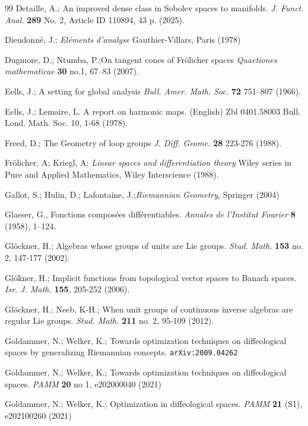 \documentclass{amsart}
\newcounter{ex}
\newcounter{re}
\begin{document}
\begin{thebibliography}{99}
 Detaille, A.;
An improved dense class in Sobolev spaces to manifolds. 
\emph{J. Funct. Anal.} {\bf 289} No. 2, Article ID 110894, 43 p. (2025). 

 Dieudonn\'e, J.; \textit{El\'ements d'analyse} Gauthier-Villars, Paris (1978)
	
 Dugmore, D.; Ntumba, P.;On tangent cones of Fr\"olicher spaces
\textit{Quaetiones mathematicae} \textbf{30} no.1,
67--83 (2007).


 Eells, J.;  A setting for global analysis
\textit{Bull. Amer. Math. Soc.} {\bf 72} 751--807 (1966).

 Eells, J.; Lemaire, L.
A report on harmonic maps. (English) Zbl 0401.58003
Bull. Lond. Math. Soc. 10, 1-68 (1978). 

 Freed, D.; The Geometry of loop groups \textit{J. Diff. Geome.} \textbf{28} 223-276 (1988).

 Fr\"olicher, A; Kriegl, A; {\it Linear spaces and differentiation theory} Wiley series in Pure and Applied Mathematics, Wiley Interscience  (1988).

 Gallot, S.; Hulin, D.; Lafontaine, J.;\emph{Riemannian Geometry}, Springer (2004)

{\color{black}
Glaeser, G.,
Fonctions composées différentiables.
\textit{Annales de l'Institut Fourier} 
\textbf{8} (1958), 1--124.

}

 Gl\"ockner, H.;
Algebras whose groups of units are Lie groups.
\emph{Stud. Math.} \textbf{153} no. 2, 147-177 (2002). 

 Glö\"kner, H.;
Implicit functions from topological vector spaces to Banach spaces. 
\emph{Isr. J. Math.} {\bf 155}, 205-252 (2006). 

 Gl\"ockner, H.; Neeb, K-H.;
When unit groups of continuous inverse algebras are regular Lie groups. 
\emph{Stud. Math.} \textbf{211} no. 2, 95-109 (2012). 

 Goldammer, N.; Welker, K.;
Towards optimization techniques on diffeological spaces by generalizing Riemannian concepts. \texttt{arXiv:2009.04262}

Goldammer, N.; Welker, K.; Towards optimization techniques on diffeological spaces.
\emph{PAMM} {\bf 20} no 1, e202000040 (2021)

 Goldammer, N.; Welker, K.; Optimization in diffeological spaces.
\emph{PAMM} {\bf 21} (S1), e202100260 (2021)


\end{thebibliography}
\end{document}
